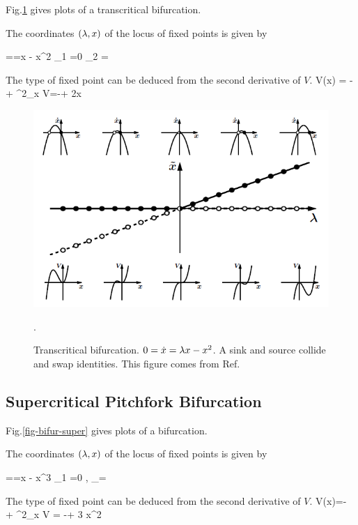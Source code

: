 Fig.\ref{fig-bifur-trans} gives plots of a transcritical
bifurcation.

The coordinates $(\lambda, x)$ of the locus 
of fixed points is given by

==\lam x - x^2
\implies  {}_1 =0\;\;\;
_2 =\lam
\eeq

 The type of
 fixed point can be 
 deduced from the second derivative
 of $V$.
\beq
V(x) = -\lam{}
+
\implies
\partial^2_x V=-\lam + 2x
\eeq

\begin{figure}[h!]
 \centering
 \includegraphics[width=5in]
 {dynamical-sys/bifur-trans.png}
 \caption{Transcritical bifurcation. $0=\dot{x}=\lambda x - x^2$. 
 A sink and source collide and swap identities.
 This
 figure  comes from Ref.\cite{dynamical-fuchs}}.
 \label{fig-bifur-trans}
 \end{figure}
 
\subsection{Supercritical 
Pitchfork Bifurcation}
Fig.\ref{fig-bifur-super} gives plots of a \supercri
bifurcation.

The coordinates $(\lambda, x)$ of the locus 
of fixed points is given by

==\lam x  - x^3
\implies {}_1 =0
\;,\;\;
_\pm = \pm \sqrt{\lam}
\eeq

 The type of
 fixed point can be 
 deduced from the second derivative
 of $V$.
\beq
V(x)=-\lam {} 
+ 
\implies \partial^2_x V = -\lam + 3 x^2
\eeq

